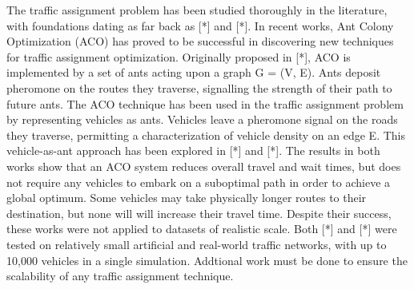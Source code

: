 \documentclass[conference]{IEEEtran}
\begin{document}
The traffic assignment problem has been studied thoroughly in the literature, with foundations dating as far back as [*] and [*]. In recent works, Ant Colony Optimization (ACO) has proved to be successful in discovering new techniques for traffic assignment optimization. Originally proposed in [*], ACO is implemented by a set of ants acting upon a graph G = (V, E). Ants deposit pheromone on the routes they traverse, signalling the strength of their path to future ants. The ACO technique has been used in the traffic assignment problem by representing vehicles as ants. Vehicles leave a pheromone signal on the roads they traverse, permitting a characterization of vehicle density on an edge E. This vehicle-as-ant approach has been explored in [*] and [*]. The results in both works show that an ACO system reduces overall travel and wait times, but does not require any vehicles to embark on a suboptimal path in order to achieve a global optimum. Some vehicles may take physically longer routes to their destination, but none will will increase their travel time. Despite their success, these works were not applied to datasets of realistic scale. Both [*] and [*] were tested on relatively small artificial and real-world traffic networks, with up to 10,000 vehicles in a single simulation. Addtional work must be done to ensure the scalability of any traffic assignment technique.
\end{document}
